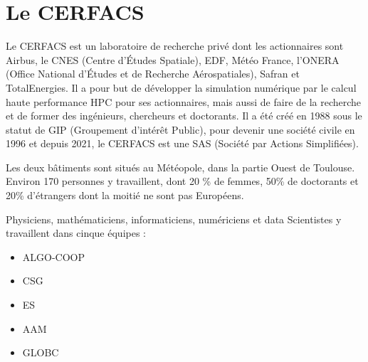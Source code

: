 \chapter{Le CERFACS}


Le CERFACS est un laboratoire de recherche privé dont les actionnaires sont Airbus, le CNES (Centre d'Études Spatiale), EDF, Météo France, l'ONERA (Office National d'Études et de Recherche Aérospatiales), Safran et TotalEnergies. Il a pour but de développer la simulation numérique par le calcul haute performance \ac{HPC} pour ses actionnaires, mais aussi de faire de la recherche et de former des ingénieurs, chercheurs et doctorants. Il a été créé en 1988 sous le statut de GIP (Groupement d’intérêt Public), pour devenir une société civile en 1996 et depuis 2021, le CERFACS est une SAS (Société par Actions Simplifiées).

\vspace{0,5cm}

Les deux bâtiments sont situés au Météopole, dans la partie Ouest de Toulouse. Environ 170 personnes y travaillent, dont 20 \% de femmes, 50\% de doctorants et 20\% d'étrangers dont la moitié ne sont pas Européens.

Physiciens, mathématiciens, informaticiens, numériciens et data Scientistes y travaillent dans cinque équipes :

\begin{itemize}
    \item \ac{ALGO-COOP}
    \item \ac{CSG}
    \item \ac{ES}
    \item \ac{AAM}
    \item \ac{GLOBC}
\end{itemize}

\hspace{0,5cm}

